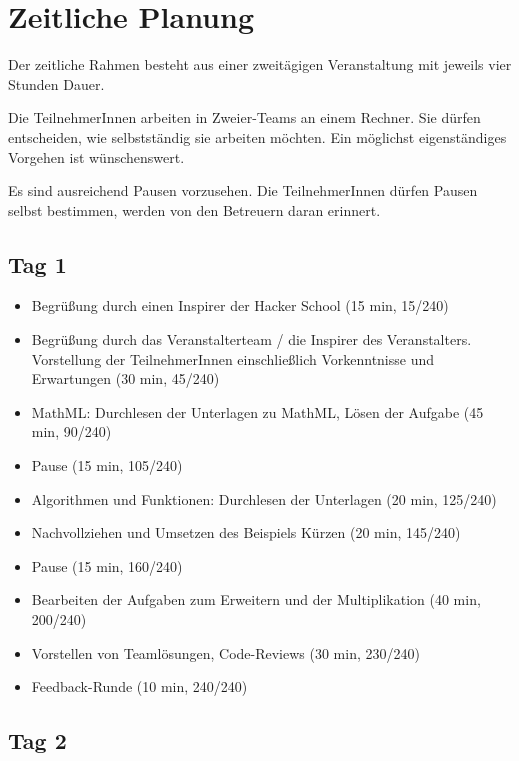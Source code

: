 \section{Zeitliche Planung}

Der zeitliche Rahmen besteht aus einer zweitägigen Veranstaltung mit jeweils vier Stunden Dauer.

Die TeilnehmerInnen arbeiten in Zweier-Teams an einem Rechner. Sie dürfen entscheiden, wie selbstständig sie arbeiten möchten. Ein möglichst eigenständiges Vorgehen ist wünschenswert.

Es sind ausreichend Pausen vorzusehen. Die TeilnehmerInnen dürfen Pausen selbst bestimmen, werden von den Betreuern daran erinnert.

\subsection*{Tag 1}

\begin{itemize}
	\item Begrüßung durch einen Inspirer der Hacker School (15 min, 15/240)
	\item Begrüßung durch das Veranstalterteam / die Inspirer des Veranstalters. Vorstellung der TeilnehmerInnen einschließlich Vorkenntnisse und Erwartungen (30 min, 45/240)
	\item MathML: Durchlesen der Unterlagen zu MathML, Lösen der Aufgabe (45 min, 90/240)
	\item Pause (15 min, 105/240)
	\item Algorithmen und Funktionen: Durchlesen der Unterlagen (20 min, 125/240)
	\item Nachvollziehen und Umsetzen des Beispiels Kürzen (20 min, 145/240)
	\item Pause (15 min, 160/240)
	\item Bearbeiten der Aufgaben zum Erweitern und der Multiplikation (40 min, 200/240)
	\item Vorstellen von Teamlösungen, Code-Reviews (30 min, 230/240)
	\item Feedback-Runde (10 min, 240/240)
\end{itemize}

\subsection*{Tag 2}

